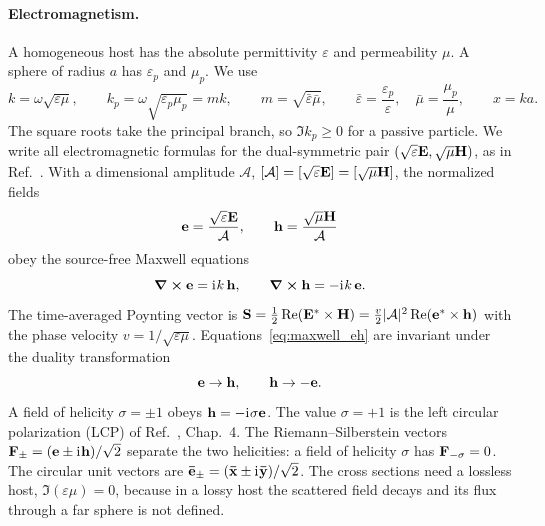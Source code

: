 \documentclass[
    pra,
    aps,
    reprint,
    onecolumn,
    amsmath,amssymb,
    a4paper,
    superscriptaddress,
    10pt,
    nofootinbib
]{revtex4-2}
\newcommand{\iu}{\mathrm{i}\mkern1mu}                 %
\newcommand{\ort}[1]{\boldsymbol{\mathbf{\bar{#1}}}}  %
\newcommand{\eb}{\bar{\varepsilon}}
\newcommand{\mb}{\bar{\mu}}
\begin{document}
\paragraph{Electromagnetism.}
A homogeneous host has the absolute permittivity $\varepsilon$ and permeability $\mu$.
A sphere of radius $a$ has $\varepsilon_p$ and $\mu_p$.
We use
\begin{equation}
    k = \omega\sqrt{\varepsilon\mu}, \qquad
    k_p = \omega \sqrt{\varepsilon_p \mu_p} = m k, \qquad
    m = \sqrt{\eb \mb}, \qquad
    \eb = \frac{\varepsilon_p}{\varepsilon}, \quad
    \mb = \frac{\mu_p}{\mu}, \qquad
    x = k a .
    \label{eq:params}
\end{equation}
The square roots take the principal branch, so $\Im k_p \geq 0$ for a passive particle.
We write all electromagnetic formulas for the dual-symmetric pair $(\sqrt{\varepsilon}\vb{E}, \sqrt{\mu}\vb{H})$, as in Ref.~\cite{Thesis}.
With a dimensional amplitude $\mathcal{A}$, $[\mathcal{A}] = [\sqrt{\varepsilon}\vb{E}] = [\sqrt{\mu}\vb{H}]$, the normalized fields
\begin{equation}
    \vb{e} = \frac{\sqrt{\varepsilon}\vb{E}}{\mathcal{A}}, \qquad
    \vb{h} = \frac{\sqrt{\mu}\vb{H}}{\mathcal{A}}
    \label{eq:eh}
\end{equation}
obey the source-free Maxwell equations
\begin{equation}
    \curl \vb{e} = \iu k\, \vb{h}, \qquad
    \curl \vb{h} = -\iu k\, \vb{e} .
    \label{eq:maxwell_eh}
\end{equation}
The time-averaged Poynting vector is $\vb{S} = \frac{1}{2}\Re(\vb{E}^* \times \vb{H}) = \frac{v}{2} |\mathcal{A}|^2 \Re(\vb{e}^* \times \vb{h})$ with the phase velocity $v = 1/\sqrt{\varepsilon\mu}$.
Equations~\eqref{eq:maxwell_eh} are invariant under the duality transformation
\begin{equation}
    \vb{e} \to \vb{h}, \qquad \vb{h} \to -\vb{e}.
    \label{eq:duality}
\end{equation}
A field of helicity $\sigma = \pm 1$ obeys $\vb{h} = -\iu \sigma \vb{e}$.
The value $\sigma = +1$ is the left circular polarization (LCP) of Ref.~\cite{Thesis}, Chap.~4.
The Riemann--Silberstein vectors $\vb{F}_{\pm} = (\vb{e} \pm \iu \vb{h})/\sqrt{2}$ separate the two helicities: a field of helicity $\sigma$ has $\vb{F}_{-\sigma} = 0$.
The circular unit vectors are $\ort{e}_{\pm} = (\ort{x} \pm \iu \ort{y})/\sqrt{2}$.
The cross sections need a lossless host, $\Im(\varepsilon\mu) = 0$, because in a lossy host the scattered field decays and its flux through a far sphere is not defined.
\end{document}
